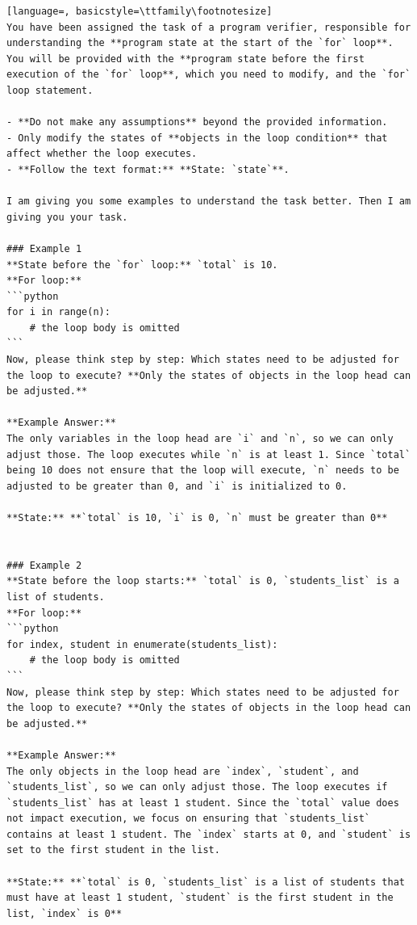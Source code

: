 \documentclass[sigconf]{acmart}
\begin{document}
\begin{tcolorbox}[ colback=gray!10, colframe=black, arc=5pt]
\begin{lstlisting}[language=, basicstyle=\ttfamily\footnotesize]
You have been assigned the task of a program verifier, responsible for understanding the **program state at the start of the `for` loop**. You will be provided with the **program state before the first execution of the `for` loop**, which you need to modify, and the `for` loop statement.

- **Do not make any assumptions** beyond the provided information.
- Only modify the states of **objects in the loop condition** that affect whether the loop executes.
- **Follow the text format:** **State: `state`**.

I am giving you some examples to understand the task better. Then I am giving you your task.

### Example 1  
**State before the `for` loop:** `total` is 10.  
**For loop:**  
```python
for i in range(n):
    # the loop body is omitted
```
Now, please think step by step: Which states need to be adjusted for the loop to execute? **Only the states of objects in the loop head can be adjusted.**

**Example Answer:**  
The only variables in the loop head are `i` and `n`, so we can only adjust those. The loop executes while `n` is at least 1. Since `total` being 10 does not ensure that the loop will execute, `n` needs to be adjusted to be greater than 0, and `i` is initialized to 0.

**State:** **`total` is 10, `i` is 0, `n` must be greater than 0**


### Example 2  
**State before the loop starts:** `total` is 0, `students_list` is a list of students.  
**For loop:**  
```python
for index, student in enumerate(students_list):
    # the loop body is omitted
```
Now, please think step by step: Which states need to be adjusted for the loop to execute? **Only the states of objects in the loop head can be adjusted.**

**Example Answer:**  
The only objects in the loop head are `index`, `student`, and `students_list`, so we can only adjust those. The loop executes if `students_list` has at least 1 student. Since the `total` value does not impact execution, we focus on ensuring that `students_list` contains at least 1 student. The `index` starts at 0, and `student` is set to the first student in the list.

**State:** **`total` is 0, `students_list` is a list of students that must have at least 1 student, `student` is the first student in the list, `index` is 0**


\end{lstlisting}
\end{tcolorbox}
\end{document}
